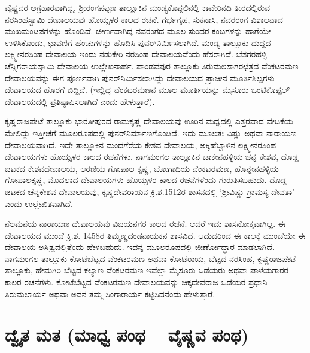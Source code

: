 ವೈಷ್ಣವರ ಅಗ್ರಹಾರವಾಗಿದ್ದ, ಶ‍್ರೀರಂಗಪಟ್ಟಣ ತಾಲ್ಲೂಕಿನ ಮಂಡ್ಯಕೊಪ್ಪಲಿನಲ್ಲಿ ಕಾವೇರಿನದಿ ತೀರದಲ್ಲಿರುವ ನರಸಿಂಹಸ್ವಾಮಿ ದೇವಾಲಯವು ಹೊಯ್ಸಳರ ಕಾಲದ ರಚನೆ. ಗರ್ಭಗೃಹ, ಸುಕನಾಸಿ, ನವರರಂಗ ವಿಶಾಲವಾದ ಮುಖಮಂಟಪಗಳನ್ನು ಹೊಂದಿದೆ. ಜೀರ್ಣವಾಗಿದ್ದ ನವರಂಗದ ಮೂಲ ಸುಂದರ ಕಂಬಗಳನ್ನು ಹಾಗೆಯೇ ಉಳಿಸಿಕೊಂಡು, ಛಾವಣಿಗೆ ಹೆಂಚುಗಳನ್ನು ಹೊದಿಸಿ ಪುನರ್​ನಿರ್ಮಿಸಲಾಗಿದೆ. ಮಂಡ್ಯ ತಾಲ್ಲೂಕು ದುದ್ದದ ಲಕ್ಷ್ಮೀನರಸಿಂಹ ದೇವಾಲಯ ಇಂದು ನಡುಕೇರಿ ನರಸಿಂಹ ದೇವಾಲಯವೆಂದು ಹೆಸರಾಗಿದೆ. ಬೆಸಗರಹಳ್ಳಿ ಚೆನ್ನಿಗರಾಯಸ್ವಾಮಿ ದೇವಾಲಯ ಉಲ್ಲೇಖನಾರ್ಹ. ಪಾಂಡವಪುರ ತಾಲ್ಲೂಕು ತಿರುಮಲಸಾಗರಛತ್ರದ ವೆಂಕಟರಮಣ ದೇವಾಲಯವನ್ನು ಈಗ ಪೂರ್ಣವಾಗಿ ಪುನರ್​ನಿರ್ಮಿಸ\-ಲಾಗಿದ್ದು ದೇವಾಲಯದ ಪ್ರಾಚೀನ ಮೂರ್ತಿಶಿಲ್ಪಗಳು ದೇವಾಲಯದ ಹೊರಗೆ ಬಿದ್ದಿವೆ. (ಇಲ್ಲಿದ್ದ ವೆಂಕಟರಮಣನ ಮೂಲ ಮೂರ್ತಿಯನ್ನು ಮೈಸೂರು ಒಂಟಿಕೊಪ್ಪಲ್​ ದೇವಾಲಯದಲ್ಲಿ ಪ್ರತಿಷ್ಠಾಪಿಸಲಾಗಿದೆ ಎಂದು ಹೇಳುತ್ತಾರೆ).

ಕೃಷ್ಣರಾಜಪೇಟೆ ತಾಲ್ಲೂಕು ಭಾರತೀಪುರದ ರಾಮಕೃಷ್ಣ ದೇವಾಲಯವು ಊರಿನ ಮಧ್ಯದಲ್ಲಿ ಎತ್ತರವಾದ ವೇದಿಕೆಯ ಮೇಲಿದ್ದು ಇತ್ತೀಚೆಗೆ ಮೂಲರೂಪದಲ್ಲಿ ಪುನರ್​ನಿರ್ಮಾಣಗೊಂಡಿದೆ. ಇದು ಮೂಲತಃ ವಿಷ್ಣು ಅಥವಾ ನಾರಾಯಣ ದೇವಾಲಯವಾಗಿದೆ. ಇದೇ ತಾಲ್ಲೂಕಿನ ಮಂದಗೆರೆಯ ಕೇಶವ ದೇವಾಲಯ, ಅಕ್ಕಿಹೆಬ್ಬಾಳಿನ ಲಕ್ಷ್ಮೀನರಸಿಂಹ ದೇವಾಲಯಗಳು ಹೊಯ್ಸಳರ ಕಾಲದ ರಚನೆಗಳು. ನಾಗಮಂಗಲ ತಾಲ್ಲೂಕಿನ ಚಾಕೇನಹಳ್ಳಿಯ ಚನ್ನ ಕೇಶವ, ದೊಡ್ಡ ಜಟಕದ ಕೇಶವದೇವಾಲಯ, ಆರಣಿಯ ಗೋಪಾಲ ಕೃಷ್ಣ, ಬೋಗಾದಿಯ ವೆಂಕಟರಮಣ, ಹೊನ್ನೇನಹಳ್ಳಿಯ ಗೋಪಾಲಕೃಷ್ಣ, ಮೊದಲಾದ ದೇವಾಲಯಗಳು ಹೊಯ್ಸಳರ ಕಾಲದ ರಚನೆಗಳೆಂದು ಗುರುತಿಸಬಹುದು. ದೊಡ್ಡ ಜಟಕದ ಚೆನ್ನಕೇಶವ ದೇವಾಲಯವು, ಕೃಷ್ಣದೇವರಾಯನ ಕ್ರಿ.ಶ.1512ರ ಶಾಸನದಲ್ಲಿ ‘ಶ‍್ರೀವಿಷ್ಣು ಗ್ರಾಮಸ್ಯ ದೇವತಾ’ ಎಂದು ಉಲ್ಲೇಖಿತವಾಗಿದೆ.

ನೆಲಮನೆಯ ನಾರಾಯಣ ದೇವಾಲಯವು ವಿಜಯನಗರ ಕಾಲದ ರಚನೆ. ಆದರೆ ಇದು ಶಾಸನೋಕ್ತವಾಗಿಲ್ಲ. ಈ ದೇವಾಲಯದ ಮುಂದೆ ಕ್ರಿ.ಶ. 1458ರ ತಿಮ್ಮಣ್ಣದಂಡನಾಯಕನ ಶಾಸವಿದೆ. ಆದುದರಿಂದ ಈ ಕಾಲಕ್ಕೆ ಮುಂಚೆಯೇ ಈ ದೇವಾಲಯ ಅಸ್ತಿತ್ವದಲ್ಲಿತ್ತೆಂದು ಹೇಳಬಹುದು. ಇದನ್ನ ಮೂಲರೂಪದಲ್ಲಿ ಜೀರ್ಣೋದ್ಧಾರ ಮಾಡಲಾಗಿದೆ. ನಾಗಮಂಗಲ ತಾಲ್ಲೂಕು ಕೋಟೆಬೆಟ್ಟದ ವೆಂಕಟರಮಣ ಅಥವಾ ಕೋಟೆರಾಯ, ಬೆಟ್ಟದ ನರಸಿಂಹ, ಕೃಷ್ಣರಾಜಪೇಟೆ ತಾಲ್ಲೂಕು, ಹೇಮಗಿರಿ ಬೆಟ್ಟದ ಕಲ್ಯಾಣ ವೆಂಕಟರಮಣ ಇವೆಲ್ಲಾ ಮೈಸೂರು ಒಡೆಯರು ಅಥವಾ ಪಾಳೆಯಗಾರರ ಕಾಲರ ರಚನೆಗಳು. ಕೋಟೆಬೆಟ್ಟದ ವೆಂಕಟರಮಣ ದೇವಾಲಯವನ್ನು ಚಿಕ್ಕದೇವರಾಜ ಒಡೆಯರ ಪ್ರಧಾನಿ ತಿರುಮಲಾರ್ಯ ಅಥವಾ ಅವನ ತಮ್ಮ ಸಿಂಗಾರಾರ್ಯ ಕಟ್ಟಿಸಿದನೆಂದು ಹೇಳುತ್ತಾರೆ.


\section*{ದ್ವೈತ ಮತ (ಮಾಧ್ವ ಪಂಥ – ವೈಷ್ಣವ ಪಂಥ)}

